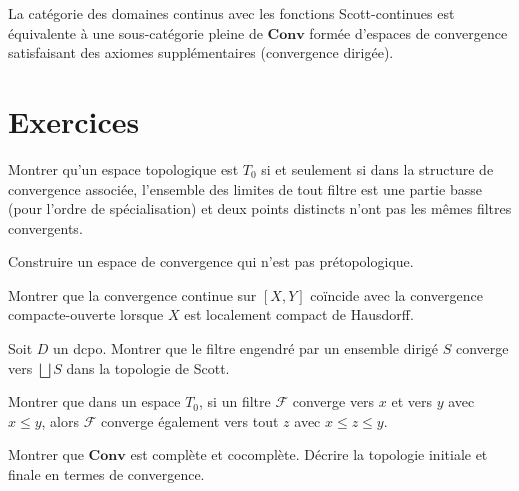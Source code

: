 \begin{theoreme}
La cat\'egorie des domaines continus avec les fonctions Scott-continues est \'equivalente
\`a une sous-cat\'egorie pleine de $\mathbf{Conv}$ form\'ee d'espaces de convergence
satisfaisant des axiomes suppl\'ementaires (convergence dirig\'ee).
\end{theoreme}

\section{Exercices}

\begin{exercice}
Montrer qu'un espace topologique est $T_0$ si et seulement si dans la structure de
convergence associ\'ee, l'ensemble des limites de tout filtre est une partie basse
(pour l'ordre de sp\'ecialisation) et deux points distincts n'ont pas les m\^emes filtres
convergents.
\end{exercice}

\begin{exercice}
Construire un espace de convergence qui n'est pas pr\'etopologique.
\end{exercice}

\begin{exercice}
Montrer que la convergence continue sur $[X,Y]$ co\"incide avec la convergence
compacte-ouverte lorsque $X$ est localement compact de Hausdorff.
\end{exercice}

\begin{exercice}
Soit $D$ un dcpo. Montrer que le filtre engendr\'e par un ensemble dirig\'e $S$ converge
vers $\bigsqcup S$ dans la topologie de Scott.
\end{exercice}

\begin{exercice}
Montrer que dans un espace $T_0$, si un filtre $\mathcal{F}$ converge vers $x$ et vers $y$
avec $x \leq y$, alors $\mathcal{F}$ converge \'egalement vers tout $z$ avec $x \leq z
\leq y$.
\end{exercice}

\begin{exercice}
Montrer que $\mathbf{Conv}$ est compl\`ete et cocompl\`ete. D\'ecrire la topologie initiale
et finale en termes de convergence.
\end{exercice}
